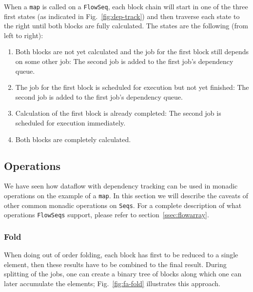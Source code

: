 \documentclass[runningheads,a4paper,fleqn]{llncs}
\begin{document}
When a \texttt{map} is called on a \texttt{FlowSeq}, each block chain will
start in one of the three first states (as indicated in
Fig.~\ref{fig:dep-track}) 
and then traverse each state to the right until both blocks are fully
calculated. The states are the following (from left to right):

\begin{enumerate}
\item Both blocks are not yet calculated and the job for the first
  block still depends on some other job: The second job is added to
  the first job's dependency queue.
\item The job for the first block is scheduled for execution but not
  yet finished: The second job is added to the first job's dependency
  queue.
\item Calculation of the first block is already completed: The second
  job is scheduled for execution immediately.
\item Both blocks are completely calculated.
\end{enumerate}

\subsection{Operations}
We have seen how dataflow with dependency tracking can be used in
monadic operations on the example of a \texttt{map}. In this section
we will describe the caveats of other common monadic operations on
\texttt{Seqs}. For a complete description of what operations
\texttt{FlowSeqs} support, please refer to
section~\ref{ssec:flowarray}.

\subsubsection{Fold}
When doing out of order folding, each block has first to be reduced to
a single element, then these results have to be combined to the final
result. During splitting of the jobs, one can create a binary tree of
blocks along which one can later accumulate the elements;
Fig.~\ref{fig:fa-fold} illustrates this approach.
\end{document}
